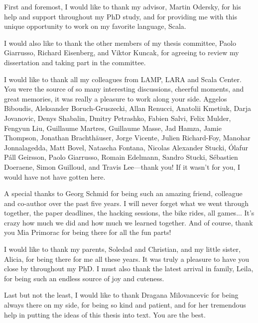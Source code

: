 First and foremost, I would like to thank my advisor, Martin Odersky, for his help and support throughout my PhD study, and for providing me with this unique opportunity to work on my favorite language, Scala.

I would also like to thank the other members of my thesis committee, Paolo Giarrusso, Richard Eisenberg, and Viktor Kuncak, for agreeing to review my dissertation and taking part in the committee.

I would like to thank all my colleagues from LAMP, LARA and Scala Center.
You were the source of so many interesting discussions, cheerful moments, and great memories, it was really a pleasure to work along your side.
Aggelos Biboudis,
Aleksander Boruch-Gruszecki,
Allan Renucci,
Anatolii Kmetiuk,
Darja Jovanovic,
Denys Shabalin,
Dmitry Petrashko,
Fabien Salvi,
Felix Mulder,
Fengyun Liu,
Guillaume Martres,
Guillaume Masse,
Jad Hamza,
Jamie Thompson,
Jonathan Brachthäuser,
Jorge Vicente,
Julien Richard-Foy,
Manohar Jonnalagedda,
Matt Bovel,
Natascha Fontana,
Nicolas Alexander Stucki,
Ólafur Páll Geirsson,
Paolo Giarrusso,
Romain Edelmann,
Sandro Stucki,
Sébastien Doeraene,
Simon Guilloud, and
Travis Lee---thank you!
If it wasn't for you, I would have not have gotten here.

A special thanks to Georg Schmid for being such an amazing friend, colleague and co-author over the past five years.
I will never forget what we went through together, the paper deadlines, the hacking sessions, the bike rides, all games...
It's crazy how much we did and how much we learned together.
And of course, thank you Mia Primorac for being there for all the fun parts!

I would like to thank my parents, Soledad and Christian, and my little sister, Alicia, for being there for me all these years.
It was truly a pleasure to have you close by throughout my PhD.
I must also thank the latest arrival in family, Leila, for being such an endless source of joy and cuteness.

Last but not the least, I would like to thank Dragana Milovancevic for being always there on my side, for being so kind and patient, and for her tremendous help in putting the ideas of this thesis into text.
You are the best.
